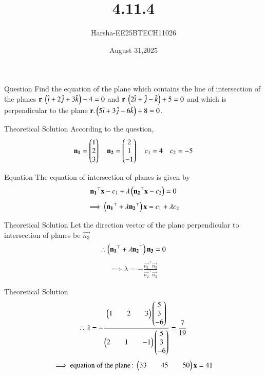 \documentclass{beamer}
\title %
{4.11.4}
\date{August 31,2025}
\author %
{Harsha-EE25BTECH11026}
\begin{document}
\frame{\titlepage}


\begin{frame}{Question}
Find the equation of the plane which contains the line of intersection of the planes $\mathbf{r}.\left(\hat{i}+2\hat{j}+3\hat{k}\right)-4=0$ and $\mathbf{r}.\left(2\hat{i}+\hat{j}-\hat{k}\right)+5=0$ and which is perpendicular to the plane $\mathbf{r}.\left(5\hat{i}+3\hat{j}-6\hat{k}\right)+8=0$.
\end{frame}

\begin{frame}{Theoretical Solution}
According to the question,\\
\begin{align}
    \mathbf{n_1}=\begin{pmatrix}1\\2\\3\end{pmatrix} \quad \mathbf{n_2}=\begin{pmatrix}2\\1\\-1\end{pmatrix} \quad c_1=4 \quad c_2=-5
\end{align}
\end{frame}

\begin{frame}{Equation}
The equation of intersection of planes is given by
\begin{align}
    \mathbf{n_1}^{\top}\mathbf{x}-c_1+\lambda\left(\mathbf{n_2}^{\top}\mathbf{x}-c_2\right)=0
\end{align}
\begin{align}
    \implies \left(\mathbf{n_1}^{\top}+\lambda\mathbf{n_2}^{\top}\right)\mathbf{x}=c_1+\lambda c_2
\end{align}
\end{frame}

\begin{frame}{Theoretical Solution}
Let the direction vector of the plane perpendicular to intersection of planes be $\vec{n_3}$
\begin{align}
    \therefore \left(\mathbf{n_1}^{\top}+\lambda\mathbf{n_2}^{\top}\right)\mathbf{n_3}=0
\end{align}
\begin{align}
    \implies \lambda=-\frac{\vec{n_1}^{\top}\vec{n_3}}{\vec{n_2}^{\top}\vec{n_3}}
\end{align}
\end{frame}
\begin{frame}{Theoretical Solution}
\begin{align}
    \therefore \lambda=-\frac{\begin{pmatrix}1&&2&&3\end{pmatrix}\begin{pmatrix}5\\3\\-6\end{pmatrix}}{\begin{pmatrix}2&&1&&-1\end{pmatrix}\begin{pmatrix}5\\3\\-6\end{pmatrix}}=\frac{7}{19}
\end{align}
\begin{align}
    \implies \text{equation of the plane\,:\;} \begin{pmatrix}33&&45&&50\end{pmatrix}\mathbf{x}=41
\end{align}
\end{frame}
\end{document}
